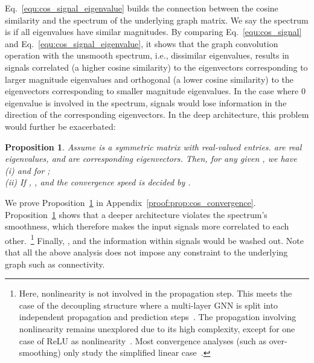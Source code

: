 \documentclass[nohyperref]{article}
\theoremstyle{plain}
\newtheorem{proposition}[theorem]{Proposition}
\theoremstyle{definition}
\theoremstyle{remark}
\begin{document}
Eq.~\ref{equ:cos_signal_eigenvalue} builds the connection between the cosine similarity and the spectrum of the underlying graph matrix.
We say the spectrum is  if all eigenvalues have similar magnitudes.
By comparing Eq.~\ref{equ:cos_signal} and Eq.~\ref{equ:cos_signal_eigenvalue}, it shows that the graph convolution operation with the unsmooth spectrum, i.e., dissimilar eigenvalues, results in signals correlated (a higher cosine similarity) to the eigenvectors corresponding to larger magnitude eigenvalues and orthogonal (a lower cosine similarity) to the eigenvectors corresponding to smaller magnitude eigenvalues.
In the case where 0 eigenvalue is involved in the spectrum, signals would lose information in the direction of the corresponding eigenvectors.
In the deep architecture, this problem would further be exacerbated:
\begin{proposition}
	\label{prop:cos_convergence}
	Assume  is a symmetric matrix with real-valued entries.  are  real eigenvalues, and  are corresponding eigenvectors. Then, for any given , we have\\
	(i)  and  for ;\\
	(ii) If , , and the convergence speed is decided by .
\end{proposition}
We prove Proposition~\ref{prop:cos_convergence} in Appendix~\ref{proof:prop:cos_convergence}.
Proposition~\ref{prop:cos_convergence} shows that a deeper architecture violates the spectrum's smoothness, which therefore makes the input signals more correlated to each other.~\footnote{
	Here, nonlinearity is not involved in the propagation step.
	This meets the case of the decoupling structure where a multi-layer GNN is split into independent propagation and prediction steps~\cite{liu2020towards,pmlr-v97-wu19e,klicpera_predict_2019,zhu2020simple,zhang2021litegem}.
	The propagation involving nonlinearity remains unexplored due to its high complexity, except for one case of ReLU as nonlinearity~\cite{oono2020graph}.
	Most convergence analyses (such as over-smoothing) only study the simplified linear case~\cite{cai2020graphnorm,liu2020towards,pmlr-v97-wu19e,klicpera_predict_2019,zhao2020pairnorm,xu2018representation,chenWHDL2020gcnii,zhu2020simple,klicpera2019diffusion,chien2021adaptive}.
}
Finally, , and the information within signals would be washed out.
Note that all the above analysis does not impose any constraint to the underlying graph such as connectivity.
\end{document}
